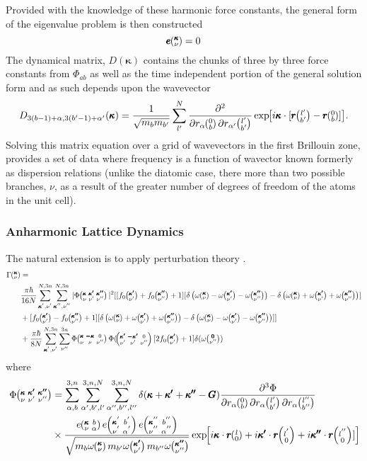 Provided with the knowledge of these harmonic force constants, the general form of the eigenvalue problem is then constructed \cite{dove_introduction_1993-3}
\begin{equation}
[D(\pmb{\kappa})-I\omega^2\kv]\pmb{e}\kv = 0
\end{equation}
%
The dynamical matrix, $D(\pmb{\kappa})$ contains the chunks of three by three force constants from $\Phi_{ab}$ as well as the time independent portion of the general solution form and as such depends upon the wavevector
\begin{equation}
D_{3(b-1)+\alpha,3(b'-1)+\alpha'}(\pmb{\kappa})=\frac{1}{\sqrt{m_bm_{b'}}}\sum_{l'}^N\frac{\partial^2}{\partial r_\alpha \Ob \partial r_{\alpha'} \lbp} \EXP{i\pmb{\kappa}\cdot [\pmb{r}\lbp-\pmb{r}\Ob]}.
\end{equation}
Solving this matrix equation over a grid of wavevectors in the first Brillouin zone, provides a set of data where frequency is a function of wavector known formerly as dispersion relations (unlike the diatomic case, there more than two possible branches, $\nu$, as a result of the greater number of degrees of freedom of the atoms in the unit cell). 

\subsubsection{Anharmonic Lattice Dynamics}

The natural extension is to apply perturbation theory \cite{turneythesis}.
%
\begin{equation}\label{EQ:Gamma_anh}
\begin{split}
\Gamma \kv &= \\
&\frac{\pi\hbar}{16N}\SUM[']\SUM['']|\Phi\kvkvpkvpp|^2[[f_0\kvp+f_0\kvpp+1][\delta\left(\omega\kv-\omega\kvp-\omega\kvpp\right)-\delta\left(\omega\kv+\omega\kvp+\omega\kvpp\right)]\\
&+[f_0\kvp-f_0\kvpp+1][\delta\left(\omega\kv+\omega\kvp+\omega\kvpp\right)-\delta\left(\omega\kv-\omega\kvp-\omega\kvpp\right)]]\\
&+\frac{\pi\hbar}{8N}\SUM[']\sum_{\nu''}^{3n}\Phi\kvOv\Phi(\kvpOv[2f_0\kvp+1]\delta(\omega\Ovpp)
\end{split}
\end{equation}
%
where
%
\begin{equation}\label{EQ:Phi_anh}
\begin{split}
\Phi\kvkvpkvpp&=\sum_{\alpha,b}^{3,n}\sum_{\alpha',b',l'}^{3,n,N}\sum_{\alpha'',b'',l''}^{3,n,N}\delta(\pmb{\kappa}+\pmb{\kappa'}+\pmb{\kappa''}-\pmb{G})\frac{\partial^3\Phi}{\partial r_\alpha \Ob \partial r_\alpha \lbp \partial r_\alpha \lbpp}\\
&\times \frac{e \kvba e \kvbain{'}e \kvbain{''}}{\sqrt{m_{b}\omega\kv
m_{b'}\omega\kvp m_{b''}\omega\kvpp}}\EXP{i\pmb{\kappa}\cdot \pmb{r}\lO+i\pmb{\kappa'}\cdot \pmb{r}\lOin{'}+i\pmb{\kappa''}\cdot \pmb{r}\lOin{''}]}
\end{split}
\end{equation}
%
